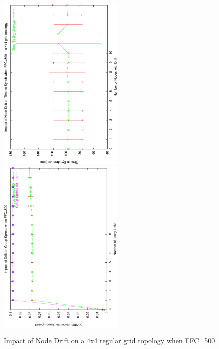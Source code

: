 \begin{figure}
\centerline{%
\includegraphics[width=6cm,angle=270]{figures/TTSvsDrift_GRID_FFC500.ps}
\includegraphics[width=6cm,angle=270]{figures/GSvsDrift_GRID_FFC500.ps}
}
\caption{Impact of Node Drift on a 4x4 regular grid topology when FFC=500}
\label{fig:drift500grid}
\end{figure}